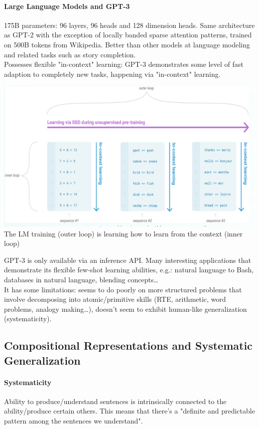 \documentclass[10pt]{report}
\begin{document}
\paragraph{Large Language Models and GPT-3} 175B parameters: 96 layers, 96 heads and 128 dimension heads. Same architecture as GPT-2 with the exception of locally banded sparse attention patterns, trained on 500B tokens from Wikipedia. Better than other models at language modeling and related tasks such as story completion.\\
Possesses flexible "in-context" learning: GPT-3 demonstrates some level of fast adaption to completely new tasks, happening via "in-context" learning.
\begin{center}
	\includegraphics[scale=0.5]{141.png}\\
	The LM training (outer loop) is learning how to learn from the context (inner loop)
\end{center}
GPT-3 is only available via an inference API. Many interesting applications that demonstrate its flexible few-shot learning abilities, e.g.: natural language to Bash, databases in natural language, blending concepts\ldots\\
It has some limitations: seems to do poorly on more structured problems that involve decomposing into atomic/primitive skills (RTE, arithmetic, word problems, analogy making\ldots), doesn't seem to exhibit human-like generalization (systematicity).
\subsection{Compositional Representations and Systematic Generalization}
\paragraph{Systematicity} Ability to produce/understand sentences is intrinsically connected to the ability/produce certain others. This means that there's a "definite and predictable pattern among the sentences we understand".
\end{document}
